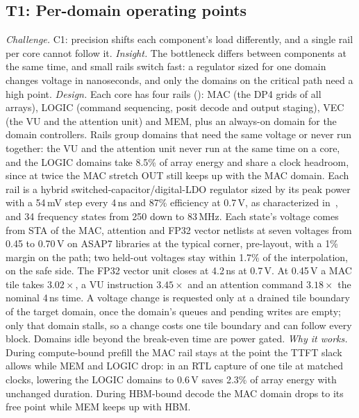 \subsection{T1: Per-domain operating points}
\emph{Challenge.} C1: precision shifts each component's load differently, and a single rail per core cannot follow it.
\emph{Insight.} The bottleneck differs between components at the same time, and small rails switch fast: a regulator sized for one domain changes voltage in nanoseconds, and only the domains on the critical path need a high point.
\emph{Design.} Each core has four rails (): MAC (the DP4 grids of all arrays), LOGIC (command sequencing, posit decode and output staging), VEC (the VU and the attention unit) and MEM, plus an always-on domain for the domain controllers.
Rails group domains that need the same voltage or never run together: the VU and the attention unit never run at the same time on a core, and the LOGIC domains take 8.5\% of array energy and share a clock headroom, since at twice the MAC stretch OUT still keeps up with the MAC domain. Each rail is a hybrid switched-capacitor/digital-LDO regulator sized by its peak power with a 54\,mV step every 4\,ns and 87\% efficiency at 0.7\,V, as characterized in~\cite{xue2026finedvfs}, and 34 frequency states from 250 down to 83\,MHz. Each state's voltage comes from STA of the MAC, attention and FP32 vector netlists at seven voltages from 0.45 to 0.70\,V on ASAP7 libraries at the typical corner, pre-layout, with a 1\% margin on the path; two held-out voltages stay within 1.7\% of the interpolation, on the safe side. The FP32 vector unit closes at 4.2\,ns at 0.7\,V. At 0.45\,V a MAC tile takes $3.02\times$, a VU instruction $3.45\times$ and an attention command $3.18\times$ the nominal 4\,ns time.
A voltage change is requested only at a drained tile boundary of the target domain, once the domain's queues and pending writes are empty; only that domain stalls, so a change costs one tile boundary and can follow every block.
Domains idle beyond the break-even time are power gated.
\emph{Why it works.} During compute-bound prefill the MAC rail stays at the point the TTFT slack allows while MEM and LOGIC drop: in an RTL capture of one tile at matched clocks, lowering the LOGIC domains to 0.6\,V saves 2.3\% of array energy with unchanged duration.
During HBM-bound decode the MAC domain drops to its free point while MEM keeps up with HBM.


